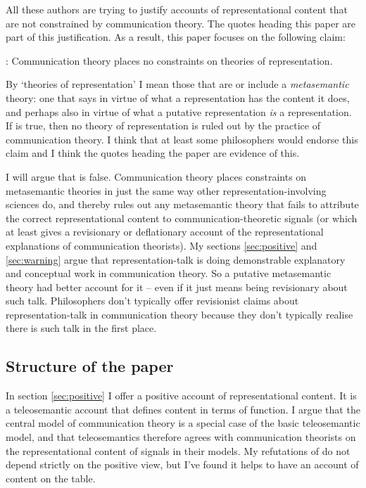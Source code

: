 \documentclass[12pt]{article}
\begin{document}
All these authors are trying to justify accounts of representational content that are not constrained by communication theory.
The quotes heading this paper are part of this justification.
As a result, this paper focuses on the following claim:

\begin{myquote}
\tic{}: Communication theory places no constraints on theories of representation.
\end{myquote}

\noindent By `theories of representation' I mean those that are or include a \textit{metasemantic} theory: one that says in virtue of what a representation has the content it does, and perhaps also in virtue of what a putative representation \textit{is} a representation.
If \tic{} is true, then no theory of representation is ruled out by the practice of communication theory.
I think that at least some philosophers would endorse this claim and I think the quotes heading the paper are evidence of this.

I will argue that \tic{} is false.
Communication theory places constraints on metasemantic theories in just the same way other representation-involving sciences do, and thereby rules out any metasemantic theory that fails to attribute the correct representational content to communication-theoretic signals (or which at least gives a revisionary or deflationary account of the representational explanations of communication theorists).
My sections \ref{sec:positive} and \ref{sec:warning} argue that representation-talk is doing demonstrable explanatory and conceptual work in communication theory.
So a putative metasemantic theory had better account for it -- even if it just means being revisionary about such talk.
Philosophers don't typically offer revisionist claims about representation-talk in communication theory because they don't typically realise there is such talk in the first place. 

\subsection{Structure of the paper}

In section \ref{sec:positive} I offer a positive account of representational content.
It is a teleosemantic account that defines content in terms of function.
I argue that the central model of communication theory is a special case of the basic teleosemantic model, and that teleosemantics therefore agrees with communication theorists on the representational content of signals in their models.
My refutations of \tic{} do not depend strictly on the positive view, but I've found it helps to have an account of content on the table.
\end{document}
